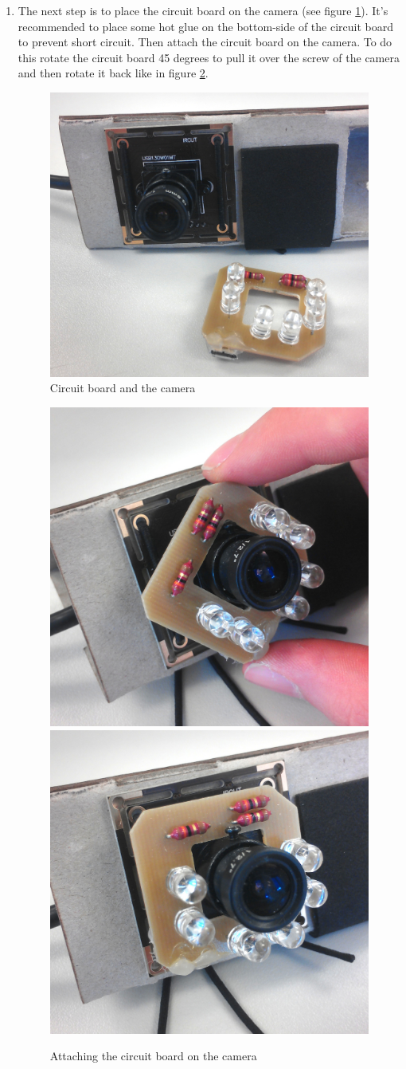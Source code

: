 \documentclass[../../Cardboard_Assembling]{subfiles}
\begin{document}
\begin{enumerate}
	\item The next step is to place the circuit board on the camera (see figure \ref{fig:holder10}). It's recommended to place some hot glue on the bottom-side of the circuit board to prevent short circuit. Then attach the circuit board on the camera. To do this rotate the circuit board 45 degrees to pull it over the screw of the camera and then rotate it back like in figure \ref{fig:holder12}.
	\begin{figure}[htb]
		\centering
		\includegraphics[width=0.55\linewidth]{holder10}
		\caption{Circuit board and the camera}
		\label{fig:holder10}
	\end{figure}
	\begin{figure}[htb]
		\centering
		\includegraphics[width=0.38\linewidth]{holder11}
		\includegraphics[width=0.4\linewidth]{holder12}
		\caption{Attaching the circuit board on the camera}
		\label{fig:holder12}
	\end{figure}

\end{enumerate}
\end{document}
